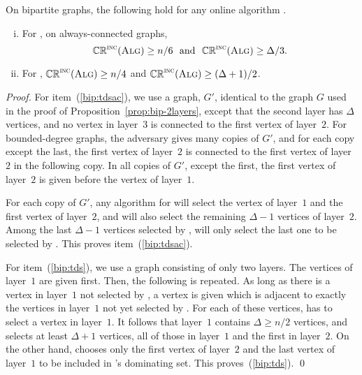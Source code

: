 \begin{proposition}
\label{prop:bip-2layers-tds}
On bipartite graphs, the following hold for any online algorithm \A.
\begin{enumerate}[(i)]
\item \label{bip:tdsac}
 For \tds, on always-connected graphs, $$\mathbb{CR}^{\textsc{\ensuremath{\text{inc}}}}(\operatorname{\textsc{Alg}})\ge n/6 \text{~~and~~}
 \mathbb{CR}^{\textsc{\ensuremath{\text{inc}}}}(\operatorname{\textsc{Alg}}) \ge \Delta/3.$$
\item \label{bip:tds}
 For \tds, $\mathbb{CR}^{\textsc{\ensuremath{\text{inc}}}}(\operatorname{\textsc{Alg}})\ge n/4$ \; and \; $\mathbb{CR}^{\textsc{\ensuremath{\text{inc}}}}(\operatorname{\textsc{Alg}})\ge (\Delta+1)/2$.
\end{enumerate}
\end{proposition}
\begin{proof}
For item~(\ref{bip:tdsac}), we use a graph, $G'$, identical to the
graph $G$ used in the proof of Proposition~\ref{prop:bip-2layers},
except that the second layer has $\Delta$ vertices, and no vertex in
layer~$3$ is connected to the first vertex of layer~$2$.
For bounded-degree graphs, the adversary gives many copies of $G'$,
and for each copy except the 
last, the first vertex of layer~$2$ is connected to the first vertex
of layer~$2$ in the following copy.
In all copies of $G'$, except the first, the first vertex of layer~$2$
is given before the vertex of layer~$1$.


For each copy of $G'$, any \incr algorithm for \tds will select the vertex of
layer~$1$ and the first vertex of layer~$2$, and
\A will also select the remaining $\Delta-1$ vertices of layer~$2$.
Among the last $\Delta-1$ vertices selected by \A, \onopt will only
select the last one to be selected by \A.
This proves item~(\ref{bip:tdsac}).


For item~(\ref{bip:tds}), we use a graph consisting of only two layers.
The vertices of layer~$1$ are given first.
Then, the following is repeated.
As long as there is a vertex in layer~$1$ not selected by \A, a
vertex is given which is adjacent to exactly the vertices in layer~$1$
not yet selected by \A.
For each of these vertices, \ALG has to select a vertex in layer~$1$.
It follows that layer~$1$ contains $\Delta \geq n/2$ vertices, and \ALG
selects at least $\Delta+1$ vertices, all of those in layer~$1$ and the
first in layer~$2$.
On the other hand, \onopt chooses only the first vertex of layer~$2$
and the last vertex of layer~$1$ to be included in \ALG's dominating
set.
This proves~(\ref{bip:tds}). 
\qed\end{proof}


